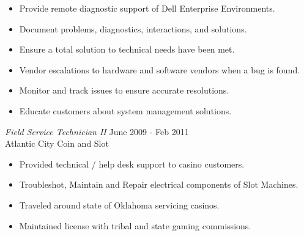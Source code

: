 \documentclass[margin]{res}
\begin{document}
\begin{resume}
\begin{itemize}
 		\item Provide remote diagnostic support of Dell Enterprise Environments.
 		\item Document problems, diagnostics, interactions, and solutions.
 		\item Ensure a total solution to technical needs have been met.
 		\item Vendor escalations to hardware and software vendors when a bug is found.
 		\item Monitor and track issues to ensure accurate resolutions.
 		\item Educate customers about system management solutions.
 	\end{itemize}
 	{\sl Field Service Technician II} \hfill June 2009 - Feb 2011 \\
 	Atlantic City Coin and Slot
 	\begin{itemize}  \itemsep -2pt %
 		\item Provided technical / help desk support to casino customers.
 		\item Troubleshot, Maintain and Repair electrical components of Slot Machines.
 		\item Traveled around state of Oklahoma servicing casinos.
 		\item Maintained license with tribal and state gaming commissions.
 	\end{itemize} 	
 	
 	
\end{resume}
\end{document}
